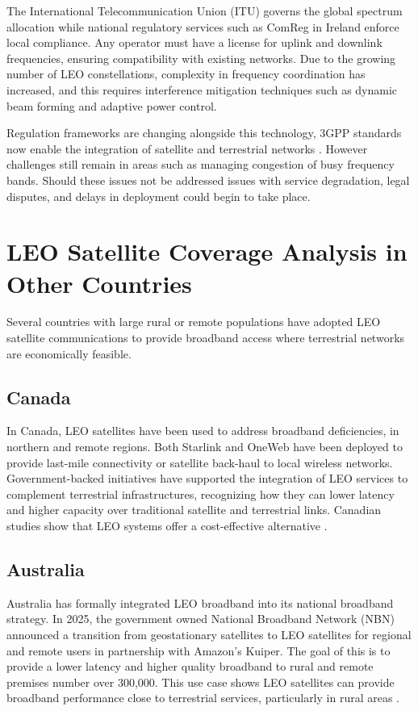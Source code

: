 The International Telecommunication Union (ITU) governs the global spectrum allocation while national regulatory services such as ComReg in Ireland enforce local compliance. Any operator must have a license for uplink and downlink frequencies, ensuring compatibility with existing networks. Due to the growing number of LEO constellations, complexity in frequency coordination has increased, and this requires interference mitigation techniques such as dynamic beam forming and adaptive power control\cite{ituWRS22SatelliteRegulation2023}.

Regulation frameworks are changing alongside this technology, 3GPP standards now enable the integration of satellite and terrestrial networks \cite{chalmers546711}. However challenges still remain in areas such as managing congestion of busy frequency bands. Should these issues not be addressed issues with service degradation, legal disputes, and delays in deployment could begin to take place. 


\section{LEO Satellite Coverage Analysis in Other Countries}
Several countries with large rural or remote populations have adopted LEO satellite communications to provide broadband access where terrestrial networks are economically feasible. 



\subsection{Canada}
In Canada, LEO satellites have been used to address broadband deficiencies, in northern and remote regions. Both Starlink and OneWeb have been deployed to provide last-mile connectivity or satellite back-haul to local wireless networks. Government-backed initiatives have supported the integration of LEO services to complement terrestrial infrastructures, recognizing how they can lower latency and higher capacity over traditional satellite and terrestrial links. Canadian studies show that LEO systems offer a cost-effective alternative \cite{telesat_canada_leo_2026}. 

\subsection{Australia}
Australia has formally integrated LEO broadband into its national broadband strategy. In 2025, the government owned National Broadband Network (NBN) announced a transition from geostationary satellites to LEO satellites for regional and remote users in partnership with Amazon's Kuiper. The goal of this is to provide a lower latency and higher quality broadband to rural and remote premises number over 300,000. This use case shows LEO satellites can provide broadband performance close to terrestrial services, particularly in rural areas \cite{nbn_kuiper_2025}. 

